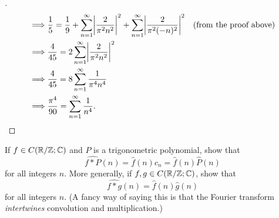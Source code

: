 \begin{proof}[]
\begin{align*}
    \implies & \dfrac{1}{5} = \dfrac{1}{9} + \sum_{n = 1}^\infty \abs{\dfrac{2}{\pi^2 n^2}}^2 + \sum_{n = 1}^\infty \abs{\dfrac{2}{\pi^2 (-n)^2}}^2 &  & \text{(from the proof above)} \\
    \implies & \dfrac{4}{45} = 2 \sum_{n = 1}^\infty \abs{\dfrac{2}{\pi^2 n^2}}^2                                                                                                      \\
    \implies & \dfrac{4}{45} = 8 \sum_{n = 1}^\infty \dfrac{1}{\pi^4 n^4}                                                                                                              \\
    \implies & \dfrac{\pi^4}{90} = \sum_{n = 1}^\infty \dfrac{1}{n^4}.
  \end{align*}
\end{proof}

\begin{ex}\label{ii:ex:5.5.3}
  If \(f \in C(\mathbb{R} / \mathbb{Z} ; \mathbb{C})\) and \(P\) is a trigonometric polynomial, show that
  \[
    \widehat{f * P}(n) = \hat{f}(n) c_n = \hat{f}(n) \hat{P}(n)
  \]
  for all integers \(n\).
  More generally, if \(f, g \in C(\mathbb{R} / \mathbb{Z} ; \mathbb{C})\), show that
  \[
    \widehat{f * g}(n) = \hat{f}(n) \hat{g}(n)
  \]
  for all integers \(n\).
  (A fancy way of saying this is that the Fourier transform \emph{intertwines} convolution and multiplication.)
\end{ex}

